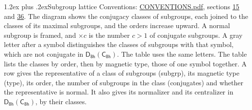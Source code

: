 \documentclass[10pt,a4paper]{article}
\makeatletter
\renewcommand\section{\@startsection{section}{1}{\z@}{-3ex plus -1ex minus -.2ex}%
  {1.2ex plus .2ex}{\normalfont\large\sffamily\bfseries\color{parttitle}}}
\numberwithin{equation}{section}
\newcommand{\grp}[1]{\mathsf{#1}}
\makeatother
\begin{document}
\section{Subgroup lattice}\label{s:subgroups}
Conventions: \href{../../CONVENTIONS.pdf}{CONVENTIONS.pdf}, sections \href{../../../rotation/CONVENTIONS.pdf\#conv.15}{15} and \href{../../CONVENTIONS.pdf\#conv.36}{36}.
The diagram shows the conjugacy classes of subgroups, each joined to the classes of its maximal subgroups, and the orders increase upward. \label{n:index.conjugates.c}\label{n:mark.conjugates}A normal subgroup is framed, and ${\times}c$ is the number $c > 1$ of conjugate subgroups. \label{n:mark.letter}A gray letter after a symbol distinguishes the classes of subgroups with that symbol, which are not conjugate in $\grp{D_{8h}}(\grp{C_{8h}})$. The table uses the same letters. The table lists the classes by order, then by magnetic type, those of one symbol together. \label{n:head.subgroup}\label{n:head.magnetic.type}\label{n:head.order}\label{n:head.conjugates}\label{n:head.normal}A row gives the representative of a class of subgroups (subgrp), its magnetic type (type), its order, the number of subgroups in the class (conjugates) and whether the representative is normal. \label{n:head.normalizer}\label{n:head.centralizer}It also gives its normalizer and its centralizer in $\grp{D_{8h}}(\grp{C_{8h}})$, by their classes. 
\end{document}
